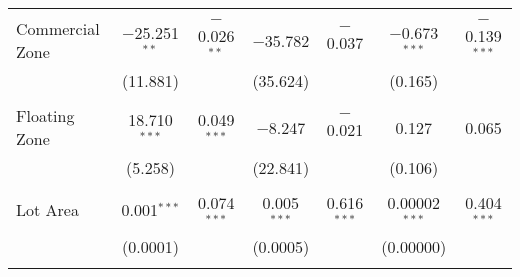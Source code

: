 \documentclass[a4paper]{article}
\begin{document}
\begin{table}[!htbp]
\begin{adjustwidth}{0.cm}{-0cm}
\begin{threeparttable}
\begin{tabular}{@{\extracolsep{-2pt}}lcccccc}
  & & & & & & \\ 
 Commercial Zone & $-$25.251$^{**}$ & $-$0.026$^{**}$ & $-$35.782 & $-$0.037 & $-$0.673$^{***}$ & $-$0.139$^{***}$ \\ 
  & (11.881) &  & (35.624) &  & (0.165) &  \\ 
  & & & & & & \\ 
 Floating Zone & 18.710$^{***}$ & 0.049$^{***}$ & $-$8.247 & $-$0.021 & 0.127 & 0.065 \\ 
  & (5.258) & & (22.841) & & (0.106) &  \\ 
  & & & & & & \\ 
 Lot Area & 0.001$^{***}$ & 0.074$^{***}$ & 0.005$^{***}$ & 0.616$^{***}$ & 0.00002$^{***}$ & 0.404$^{***}$ \\ 
  & (0.0001) &  & (0.0005) &  & (0.00000) &  \\ 
  & & & & & & \\ 
  

\end{tabular}
\end{threeparttable}
\end{adjustwidth}
\end{table}
\end{document}
